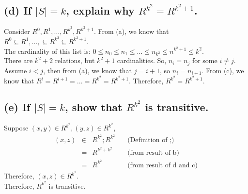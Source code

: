 \documentclass[]{article}
\begin{document}
\begin{spacing}{1.5}
		\subsection*{(d) If $ |S| = k $, explain why $ R^{k^2} = R^{k^2+1} $.}
		Consider $ R^0, R^1, ..., R^{k^2}, R^{k^2+1} $. From (a), we know that $ R^0 \subseteq R^1, ...,  \subseteq R^{k^2} \subseteq R^{k^2+1} $.\\
		The cardinality of this list is: $ 0 \leq n_0 \leq n_1 \leq ... \leq n_{k^2}  \leq n^{k^2+1} \leq k^2 $.\\
		There are $ k^2+2 $ relations, but $ k^2+1 $ cardinalities. So, $ n_i = n_j $ for some $ i \neq j $. Assume $ i < j $, then from (a), we know that $ j=i+1 $, so $ n_i = n_{i+1} $. From (c), we know that $ R^i = R^{i+1} = ... = R^{k^2} = R^{k^2+1} $. Therefore, $ R^{k^2} = R^{k^2+1} $.
		
		\subsection*{(e) If $ |S| = k $, show that $ R^{k^2} $ is transitive.}
		Suppose $ (x, y) \in R^{k^2}, (y, z) \in R^{k^2} $,
		\[\begin{array}{rclr}
			(x, z) &\in& R^{k^2}; R^{k^2} &\quad\text{(Definition of $;$)}\\
			&=& R^{k^2+k^2} &\quad\text{(from result of b)}\\
			&=& R^{k^2} &\quad\text{(from result of d and c)}
		\end{array}\]
		Therefore, $ (x, z) \in R^{k^2} $.\\ 
		Therefore, $ R^{k^2} $ is transitive.
		

\end{spacing}
\end{document}
